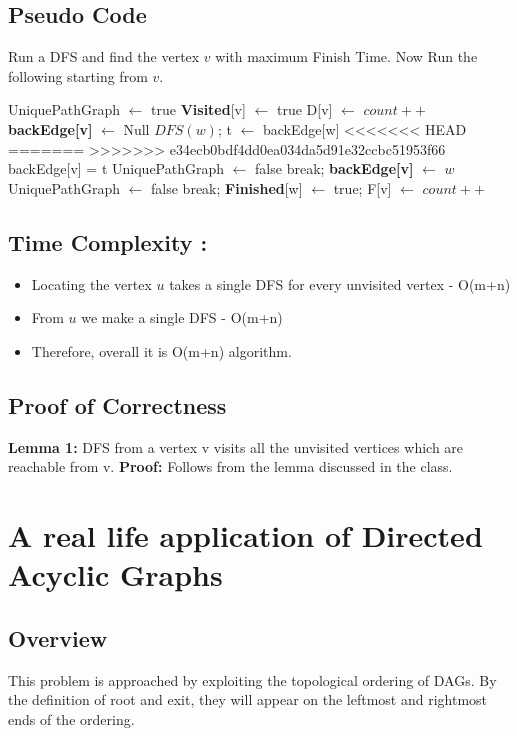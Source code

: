 \documentclass{article}
\begin{document}
\subsection{Pseudo Code}
Run a DFS and find the vertex $v$ with maximum Finish Time. Now Run the following starting from $v$. 
\begin{algorithmic}[1]
\State UniquePathGraph $\gets$ true
\State \textbf{Visited}[v] $\gets$ true
\State D[v] $\gets$ $count++$
\State \textbf{backEdge[v]} $\gets$ Null
\State $DFS(w)$;
\State t $\gets$ backEdge[w]
<<<<<<< HEAD
=======
>>>>>>> e34ecb0bdf4dd0ea034da5d91e32ccbc51953f66
\State backEdge[v] = t
\EndIf
{}
\State UniquePathGraph $\gets$ false
\State break;
\State \textbf{backEdge[v]} $\gets$ $w$
\Else
\State UniquePathGraph $\gets$ false
\State break;
\EndIf
\EndFor
\State \textbf{Finished}[w] $\gets$ true;
\State F[v] $\gets$ $count++$
\EndProcedure
\end{algorithmic}

\subsection{Time Complexity : }
\begin{itemize}
\item Locating the vertex $u$ takes a single DFS for every unvisited vertex - O(m+n)
\item From $u$ we make a single DFS - O(m+n)
\item Therefore, overall it is O(m+n) algorithm.
\end{itemize}

\subsection{Proof of Correctness}
\textbf{Lemma 1:} DFS from a vertex v visits all the unvisited vertices which are reachable from v.
\textbf{Proof:} Follows from the lemma discussed in the class. 

\newpage
\section{A real life application of Directed Acyclic Graphs}
\subsection{Overview}
This problem is approached by exploiting the topological ordering of DAGs. By the definition of root and exit, they will appear on the leftmost and rightmost ends of the ordering.
\end{document}
